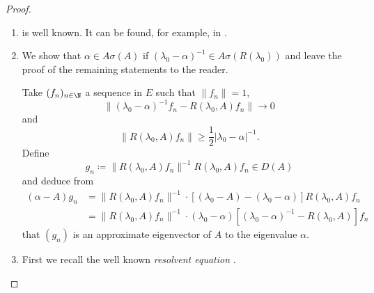 \begin{proof}
\begin{enumerate}[\upshape (i), wide, labelindent=.25em]
\item 
is well known. It can be found, for example, in \textcite[VII.9.2]{dunfordschwartz:1958}.

\item 
We show that $\alpha \in A\sigma(A)$ if\/ $(\lambda_{0}-\alpha)^{-1} \in A\sigma(R(\lambda_{0}))$ and leave the proof of the remaining statements to the reader.

Take $(f_{n})_{n \in \N}$ a sequence in $E$ such that $\|f_{n}\| = 1$, 
%
\[
	\|(\lambda_{0}-\alpha)^{-1}f_{n} - R(\lambda_{0},A)f_{n}\| \to 0
\]
%
and 
%
\[
	\|R(\lambda_{0},A)f_{n}\| \geq \frac{1}{2}|\lambda_{0} - \alpha|^{-1} .
\]
%
Define
\[
g_{n} \coloneqq \|R(\lambda_{0},A)f_{n}\|^{-1}R(\lambda_{0},A)f_{n} \in D(A)
\]
and deduce from
\begin{align*}
(\alpha-A)g_{n} &= \|R(\lambda_{0},A)f_{n}\|^{-1} \cdot 
		[(\lambda_{0}-A) - (\lambda_{0}-\alpha)]R(\lambda_{0},A)f_{n} \\  
	&= \|R(\lambda_{0},A)f_{n}\|^{-1} \cdot 			(\lambda_{0}-\alpha)[(\lambda_{0}-\alpha)^{-1} - R(\lambda_{0},A)]f_{n}
\end{align*}
that $(g_{n})$ is an approximate eigenvector of\/ $A$ to the eigenvalue $\alpha$.

\item 
First we recall the well known \emph{resolvent equation}
. 


\end{enumerate}
\end{proof}
